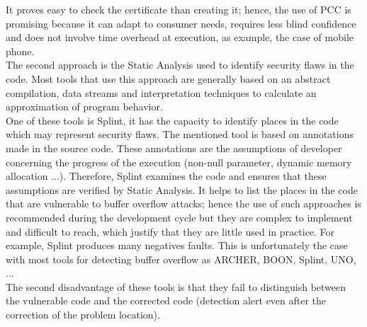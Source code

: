 \documentclass{acm_proc_article-sp}
\begin{document}
It proves easy to check the certificate than creating it; hence, the use of PCC is promising because it can adapt to consumer needs, requires less blind confidence and does not involve time overhead at execution, as example, the case of mobile phone.\\

The second approach is the Static Analysis used to identify security flaws in the code. Most tools that use this approach are generally based on an abstract compilation, data streams and interpretation techniques to calculate an approximation of program behavior.\\
One of these tools is Splint, it has the capacity to identify places in the code which may represent security flaws.
The mentioned tool is based on annotations made in the source code. These annotations are the assumptions of developer concerning the progress of the execution (non-null parameter, dynamic memory allocation ...). Therefore, Splint examines the code and ensures that these assumptions are verified by Static Analysis. It helps to list the places in the code that are vulnerable to buffer overflow attacks; hence the use of such approaches is recommended during the development cycle but they are complex to implement and difficult to reach, which justify that they are little used in practice. For example, Splint produces many negatives faults. This is unfortunately the case with most tools for detecting buffer overflow as ARCHER, BOON, Splint, UNO, ...\\
The second disadvantage of these tools is that they fail to distinguish between the vulnerable code and the corrected code (detection alert even after the correction of the problem location).
\end{document}
